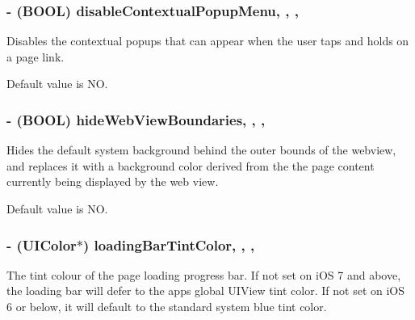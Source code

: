 \subsubsection[{disable\+Contextual\+Popup\+Menu}]{\setlength{\rightskip}{0pt plus 5cm}-\/ (B\+O\+O\+L) disable\+Contextual\+Popup\+Menu\hspace{0.3cm}{\ttfamily [read]}, {\ttfamily [write]}, {\ttfamily [nonatomic]}, {\ttfamily [assign]}}\label{interface_t_o_web_view_controller_aeb510e037dde05a88ff6fb0175d26f3f}
Disables the contextual popups that can appear when the user taps and holds on a page link.

Default value is N\+O. \hypertarget{interface_t_o_web_view_controller_a11fadf270df4ff5b11664f051ed061eb}{}
\subsubsection[{hide\+Web\+View\+Boundaries}]{\setlength{\rightskip}{0pt plus 5cm}-\/ (B\+O\+O\+L) hide\+Web\+View\+Boundaries\hspace{0.3cm}{\ttfamily [read]}, {\ttfamily [write]}, {\ttfamily [nonatomic]}, {\ttfamily [assign]}}\label{interface_t_o_web_view_controller_a11fadf270df4ff5b11664f051ed061eb}
Hides the default system background behind the outer bounds of the webview, and replaces it with a background color derived from the the page content currently being displayed by the web view.

Default value is N\+O. \hypertarget{interface_t_o_web_view_controller_ab791dcbf2db93c158264caa4ed4cdf53}{}
\subsubsection[{loading\+Bar\+Tint\+Color}]{\setlength{\rightskip}{0pt plus 5cm}-\/ (U\+I\+Color$\ast$) loading\+Bar\+Tint\+Color\hspace{0.3cm}{\ttfamily [read]}, {\ttfamily [write]}, {\ttfamily [nonatomic]}, {\ttfamily [copy]}}\label{interface_t_o_web_view_controller_ab791dcbf2db93c158264caa4ed4cdf53}
The tint colour of the page loading progress bar. If not set on i\+O\+S 7 and above, the loading bar will defer to the app\textquotesingle{}s global U\+I\+View tint color. If not set on i\+O\+S 6 or below, it will default to the standard system blue tint color.

